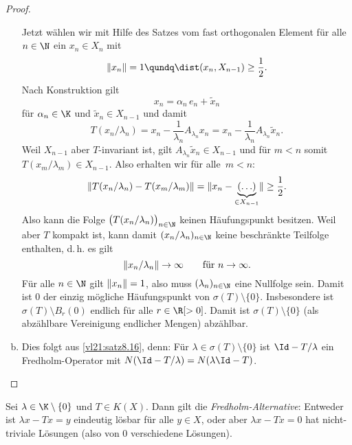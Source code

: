 \begin{proof}
\begin{enumerate}[(a)]
            Jetzt wählen wir mit Hilfe des Satzes vom fast orthogonalen Element
             für alle $n\in\N$ ein $x_n\in X_n$
            mit 
            \[ \norm{x_n}=1  \qundq  \dist(x_n, X_{n-1}) \geq \half  . \]
            Nach Konstruktion gilt
            \[ x_n = \alpha_n\, e_n + \tilde x_n  \]
            für $\alpha_n\in\K$ und $\tilde x_n\in X_{n-1}$ und damit
            \[ T(x_n/\lambda_n) = x_n - \frac{1}{\lambda_n} A_{\lambda_n} x_n
                = x_n - \frac{1}{\lambda_n} A_{\lambda_n} \tilde x_n
            . \]
            Weil $X_{n-1}$ aber $T$-invariant ist, gilt 
            $A_{\lambda_n}\tilde x_n\in X_{n-1}$ und für $m<n$ somit
            $T(x_m/\lambda_m)\in X_{n-1}$. Also erhalten wir für alle~$m<n$:
            \[ \norm{ T(x_n/\lambda_n) - T(x_m/\lambda_m) }
                = \norm{ x_n - \underbrace{(\ldots)}_{\in X_{n-1}} }
                \geq \half
            . \]
            Also kann die Folge $\bigl( T(x_n/\lambda_n) \bigr)_{n\in\N}$ keinen
            Häufungspunkt besitzen. Weil aber $T$ kompakt ist, kann damit
            $(x_n/\lambda_n)_{n\in\N}$ keine beschränkte Teilfolge enthalten,
            d.\,h. es gilt
            \[ \norm{ x_n/\lambda_n } \to\infty \fuer n\to\infty  . \]
            Für alle $n\in\N$ gilt $\norm{x_n}=1$, also muss
            $(\lambda_n)_{n\in\N}$ eine Nullfolge sein. Damit ist $0$ der einzig
            mögliche Häufungspunkt von $\sigma(T)\setminus\{0\}$.
            Insbesondere ist $\sigma(T)\setminus B_r(0)$ endlich für alle
            $r\in\R[>0]$. Damit ist $\sigma(T)\setminus\{0\}$ (als abzählbare
            Vereinigung endlicher Mengen) abzählbar.
            
        \item
            Dies folgt aus \cref{vl21:satz8.16}, denn:
            Für $\lambda\in\sigma(T)\setminus\{0\}$ ist $\Id-T/\lambda$ ein
            Fredholm-Operator mit $N(\Id-T/\lambda) = N(\lambda\Id-T)$.
        \\
        \qedhere
    \end{enumerate}
\end{proof}

\begin{thEmpty}
    Sei $\lambda\in\K\setminus\{0\}$ und $T\in K(X)$. Dann gilt die
    \emph{Fredholm-Alternative}: Entweder ist $\lambda x - Tx = y$ eindeutig
    lösbar für alle $y\in X$, oder aber $\lambda x - Tx = 0$ hat nicht-triviale
    Lösungen (also von $0$ verschiedene Lösungen).
\end{thEmpty}

